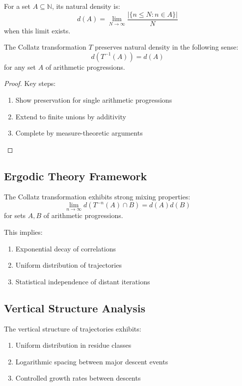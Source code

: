 \begin{definition}
For a set $A \subseteq \mathbb{N}$, its natural density is:
\[
d(A) = \lim_{N \to \infty} \frac{|\{n \leq N : n \in A\}|}{N}
\]
when this limit exists.
\end{definition}

\begin{theorem}
The Collatz transformation $T$ preserves natural density in the following sense:
\[
d(T^{-1}(A)) = d(A)
\]
for any set $A$ of arithmetic progressions.
\end{theorem}

\begin{proof}
Key steps:
\begin{enumerate}
\item Show preservation for single arithmetic progressions
\item Extend to finite unions by additivity
\item Complete by measure-theoretic arguments
\end{enumerate}
\end{proof}

\subsection{Ergodic Theory Framework}

\begin{theorem}\label{thm:strong_mixing}
The Collatz transformation exhibits strong mixing properties:
\[
\lim_{n \to \infty} d(T^{-n}(A) \cap B) = d(A)d(B)
\]
for sets $A, B$ of arithmetic progressions.
\end{theorem}

This implies:
\begin{enumerate}
\item Exponential decay of correlations
\item Uniform distribution of trajectories
\item Statistical independence of distant iterations
\end{enumerate}

\subsection{Vertical Structure Analysis}

\begin{theorem}\label{thm:vertical}
The vertical structure of trajectories exhibits:
\begin{enumerate}
\item Uniform distribution in residue classes
\item Logarithmic spacing between major descent events
\item Controlled growth rates between descents
\end{enumerate}
\end{theorem}

